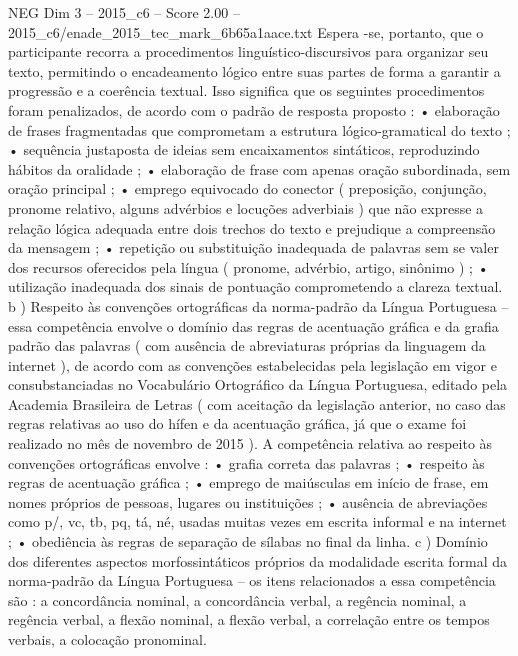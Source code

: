 \begin{textsample}{NEG Dim 3 – 2015\_c6 – Score 2.00 – 2015\_c6/enade\_2015\_tec\_mark\_6b65a1aace.txt}
Espera -se, portanto, que o participante recorra a procedimentos linguístico-discursivos para organizar seu texto, permitindo o encadeamento lógico entre suas partes de forma a garantir a progressão e a coerência textual.
Isso significa que os seguintes procedimentos foram penalizados, de acordo com o padrão de resposta proposto : • elaboração de frases fragmentadas que comprometam a estrutura lógico-gramatical do texto ; • sequência justaposta de ideias sem encaixamentos sintáticos, reproduzindo hábitos da oralidade ; • elaboração de frase com apenas oração subordinada, sem oração principal ; • emprego equivocado do conector ( preposição, conjunção, pronome relativo, alguns advérbios e locuções adverbiais ) que não expresse a relação lógica adequada entre dois trechos do texto e prejudique a compreensão da mensagem ; • repetição ou substituição inadequada de palavras sem se valer dos recursos oferecidos pela língua ( pronome, advérbio, artigo, sinônimo ) ; • utilização inadequada dos sinais de pontuação comprometendo a clareza textual. b ) Respeito às convenções ortográficas da norma-padrão da Língua Portuguesa – essa competência envolve o domínio das regras de acentuação gráfica e da grafia padrão das palavras ( com ausência de abreviaturas próprias da linguagem da internet ), de acordo com as convenções estabelecidas pela legislação em vigor e consubstanciadas no Vocabulário Ortográfico da Língua Portuguesa, editado pela Academia Brasileira de Letras ( com aceitação da legislação anterior, no caso das regras relativas ao uso do hífen e da acentuação gráfica, já que o exame foi realizado no mês de novembro de 2015 ).
A competência relativa ao respeito às convenções ortográficas envolve : • grafia correta das palavras ; • respeito às regras de acentuação gráfica ; • emprego de maiúsculas em início de frase, em nomes próprios de pessoas, lugares ou instituições ; • ausência de abreviações como p/, vc, tb, pq, tá, né, usadas muitas vezes em escrita informal e na internet ; • obediência às regras de separação de sílabas no final da linha. c ) Domínio dos diferentes aspectos morfossintáticos próprios da modalidade escrita formal da norma-padrão da Língua Portuguesa – os itens relacionados a essa competência são : a concordância nominal, a concordância verbal, a regência nominal, a regência verbal, a flexão nominal, a flexão verbal, a correlação entre os tempos verbais, a colocação pronominal.

\end{textsample}
